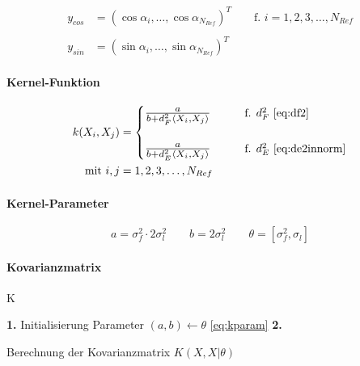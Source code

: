 \begin{align}\label{eq:gprtarget}
	y_{cos} &= (\cos \alpha_i, \ldots, \cos \alpha_{N_{Ref}})^T \qquad \text{f. } i = 1,2,3,\ldots,N_{Ref} \nonumber \\
	\\
	y_{sin} &= (\sin \alpha_i, \ldots, \sin \alpha_{N_{Ref}})^T \nonumber
\end{align}


\paragraph*{Kernel-Funktion}


\begin{align}\label{eq:kfun}
	k(X_i, X_j) &= 
		\begin{cases}
			\resizebox{.17\linewidth}{!}{$\frac{a}{b + d_F^2\langle X_i, X_j \rangle}$} &\qquad \text{f. } d_F^2 \text{ \eqref{eq:df2}} \\\\
			\resizebox{.17\linewidth}{!}{$\frac{a}{b + d_E^2\langle X_i, X_j \rangle}$} &\qquad \text{f. } d_E^2 \text{ \eqref{eq:de2innorm}}
		\end{cases} \\
\text{mit } i,j &= 1,2,3,\ldots,N_{Ref} \nonumber
\end{align}


\paragraph*{Kernel-Parameter}


\begin{equation}\label{eq:kparam}
	a = \sigma_f^2 \cdot 2 \sigma_l^2 \qquad b = 2 \sigma_l^2 \qquad \theta = \left[\sigma_f^2, \sigma_l\right]
\end{equation}


\paragraph*{Kovarianzmatrix}
K

\begin{algorithm}[h]
	\SetAlgoLined
	\textbf{1.} Initialisierung Parameter $(a,b) \leftarrow \theta$ \autoref{eq:kparam}\;
	\textbf{2.} 
	\caption{Berechnung der Kovarianzmatrix $K(X, X|\theta)$}
	\label{alg:kmatrix}
\end{algorithm}


